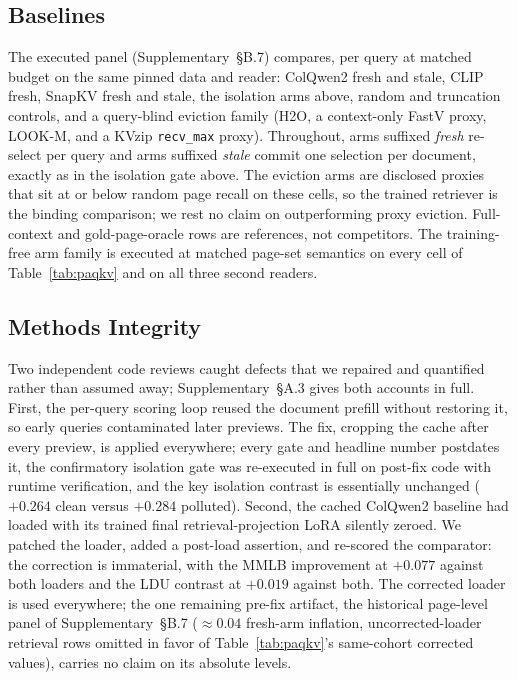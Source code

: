 \documentclass[letterpaper]{article} %
\begin{document}
\subsection{Baselines}
The executed panel (Supplementary~\S B.7) compares, per query at matched
budget on the same pinned data and reader: ColQwen2 \citep{faysse2025colpali}
fresh and stale, CLIP \citep{radford2021clip} fresh, SnapKV fresh and stale,
the isolation arms above, random and truncation controls, and a query-blind
eviction family (H2O, a context-only FastV proxy, LOOK-M, and a KVzip
\texttt{recv\_max} proxy). Throughout, arms suffixed \emph{fresh} re-select
per query and arms suffixed \emph{stale} commit one selection per document,
exactly as in the isolation gate above. The eviction arms are disclosed proxies that sit at
or below random page recall on these cells, so the trained retriever is the
binding comparison; we rest no claim on outperforming proxy eviction.
Full-context and gold-page-oracle rows are references, not competitors. The
training-free arm family is executed at matched page-set semantics on every
cell of Table~\ref{tab:paqkv} and on all three second readers.

\subsection{Methods Integrity}\label{sec:integrity}
Two independent code reviews caught defects that we repaired and quantified
rather than assumed away; Supplementary~\S A.3 gives both accounts in
full. First, the per-query scoring loop reused the document prefill without
restoring it, so early queries contaminated later previews. The fix, cropping
the cache after every preview, is applied everywhere; every gate and headline
number postdates it, the confirmatory isolation gate was re-executed in full
on post-fix code with runtime verification, and the key isolation contrast
is essentially unchanged ($+0.264$ clean versus $+0.284$ polluted). Second,
the cached ColQwen2 baseline had loaded with its
trained final retrieval-projection LoRA silently zeroed. We patched the
loader, added a post-load assertion, and re-scored the comparator: the
correction is immaterial, with the MMLB improvement at $+0.077$
against both loaders and the LDU contrast at $+0.019$ against both.
The corrected loader is used everywhere; the one remaining pre-fix artifact,
the historical page-level panel of Supplementary~\S B.7 (${\approx}0.04$
fresh-arm inflation, uncorrected-loader retrieval rows omitted in favor of
Table~\ref{tab:paqkv}'s same-cohort corrected values), carries no claim on
its absolute levels.
\end{document}

